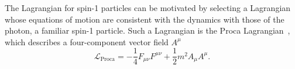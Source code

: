 The Lagrangian for spin-1 particles can be motivated by selecting a Lagrangian whose equations of motion are consistent with the dynamics with those of the photon, a familiar spin-1 particle.
Such a Lagrangian is the Proca Lagrangian~\cite{Griffiths:2008zz}, which describes a four-component vector field $A^\mu$
\begin{equation}
    \mathcal L_{\text{Proca}} = -\frac{1}{4} F_{\mu \nu}F^{\mu \nu} + \frac{1}{2} m^2 A_\mu A^\mu.
\end{equation}
